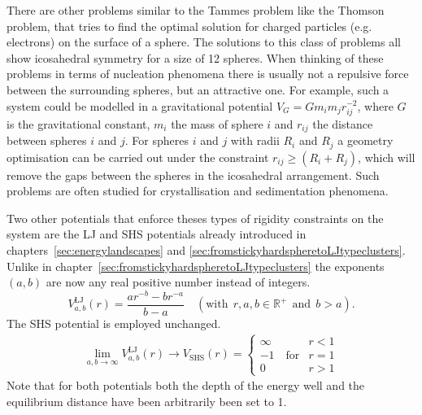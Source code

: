 There are other problems similar to the Tammes problem like the Thomson problem,
that tries to find the optimal solution for charged particles (e.g. electrons)
on the surface of a
sphere.\autocite{Wales_Structuredynamicsspherical_2006,Wales_Defectmotifsspherical_2009}
The solutions to this class of problems all show icosahedral symmetry for a
size of 12 spheres. When thinking of these problems in terms of nucleation
phenomena there is usually not a repulsive force between the surrounding
spheres, but an attractive one. For example, such a system could be modelled in
a gravitational potential $V_G=Gm_im_jr_{ij}^{-2}$, where $G$ is the gravitational
constant, $m_i$ the mass of sphere $i$ and $r_{ij}$ the distance between spheres
$i$ and $j$. For spheres $i$ and $j$ with radii $R_i$ and $R_j$ a geometry
optimisation can be carried out under the constraint $r_{ij}\geq (R_i + R_j)$,
which will remove the gaps between the spheres in the icosahedral arrangement.
Such problems are often studied for crystallisation and sedimentation
phenomena.\autocite{Levin_Crystallizationhardspheres_2000,Pusey_Hardspherescrystallization_2009}

Two other potentials that enforce theses types of rigidity constraints on the
system are the \acf{LJ} and \acf{SHS} potentials already introduced in
chapters~\ref{sec:energylandscapes} and
\ref{sec:fromstickyhardspheretoLJtypeclusters}. Unlike in
chapter~\ref{sec:fromstickyhardspheretoLJtypeclusters} the exponents $(a,b)$ are
now any real positive number instead of integers.
%
\begin{equation}
    V_{a,b}^\mathrm{LJ}(r)=\frac{ar^{-b}-br^{-a}}{b-a} \quad (\mathrm{with} \ \ r,a,b \in \mathbb{R}^+ \ \ \mathrm{and} \ \ b>a).
\label{eqn:abpot}
\end{equation}
%
The \ac{SHS} potential is employed unchanged.
%
\begin{align}
    \lim_{a,b\rightarrow \infty} V_{a,b}^\mathrm{LJ}(r) \rightarrow V_\mathrm{SHS}(r)=
    \begin{cases}
        \infty   & r < 1\\
        -1  \quad \mathrm{for} & r = 1\\
        0       & r > 1
    \end{cases}
\label{eqn:KS1}
\end{align}
%
Note that for both potentials both the depth of the energy well and the
equilibrium distance have been arbitrarily been set to 1.

